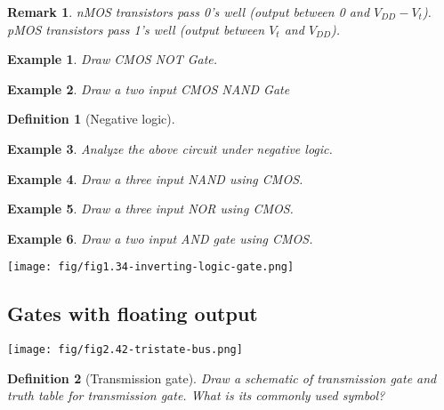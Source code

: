 \documentclass{article}
\newtheorem{example}{Example}
\newtheorem{remark}{Remark}
\newtheorem{definition}{Definition}
\begin{document}
\begin{remark}
  nMOS transistors pass 0's well (output between 0 and $V_{DD} - V_t$). pMOS
  transistors pass 1's well (output between $V_t$ and $V_{DD}$).
\end{remark}
\begin{example}
Draw CMOS NOT Gate.
\end{example}
\vspace{10em}

\begin{example}
Draw a two input CMOS NAND Gate
\end{example}
\vspace{10em}


\begin{definition}[Negative logic]
\end{definition}
\vspace{5em}

\begin{example}
  Analyze the above circuit under negative logic.
\end{example}
\vspace{10em}



\begin{example}
Draw a three input NAND using CMOS.
\end{example}
\vspace{10em}


\begin{example}
Draw a three input NOR using CMOS.
\end{example}
\vspace{10em}

\begin{example}
  Draw a two input AND gate using CMOS.
\end{example}
\vspace{10em}

\texttt{[image: fig/fig1.34-inverting-logic-gate.png]}

\subsection{Gates with floating output}
\texttt{[image: fig/fig2.42-tristate-bus.png]}

\begin{definition}[Transmission gate]
  Draw a schematic of transmission gate and truth table for transmission gate.
  What is its commonly used symbol?
\end{definition}
\vspace{10em}
\end{document}

